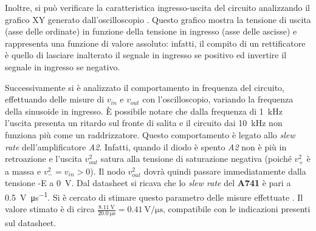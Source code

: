 \noindent
Inoltre, si può verificare la caratteristica ingresso-uscita del circuito analizzando il grafico XY generato dall'oscilloscopio . Questo grafico mostra la tensione di uscita (asse delle ordinate) in funzione della tensione in ingresso (asse delle ascisse) e rappresenta una funzione di valore assoluto: infatti, il compito di un rettificatore è quello di lasciare inalterato il segnale in ingresso se positivo ed invertire il segnale in ingresso se negativo.

\noindent
Successivamente si è analizzato il comportamento in frequenza del circuito, effettuando delle misure di $v_{in}$ e $v_{out}$ con l'oscilloscopio, variando la frequenza della sinusoide in ingresso. 
\`E possibile notare che dalla frequenza di \SI{1}{\kilo\hertz} l'uscita presenta un ritardo sul fronte di salita e il circuito dai \SI{10}{\kilo\hertz} non funziona più come un raddrizzatore. Questo comportamento è legato allo \textit{slew rate} dell'amplificatore \textit{A2}. Infatti, quando il diodo è spento \textit{A2} non è più in retroazione e l'uscita $v_{out}^2$ satura alla tensione di saturazione negativa (poiché $v_+^2$ è a massa e $v_-^2=v_{in}>0$). Il nodo $v_{out}^2$ dovrà quindi passare immediatamente dalla tensione -E a \SI{0}{\volt}. Dal datasheet si ricava che lo \textit{slew rate} del \textbf{\textmu A741} è pari a \SI{0.5}{\volt\per\micro\second}. Si è cercato di stimare questo parametro delle misure effettuate . Il valore stimato è di circa $\frac{\SI{8.11}{\volt}}{\SI{20.0}{\micro\second}}=\SI{0.41}{\volt\per\micro\second}$, compatibile con le indicazioni presenti sul datasheet.

